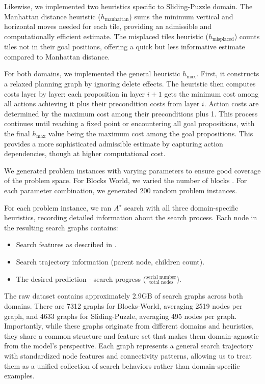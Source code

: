 \documentclass[letterpaper]{article}
\newcommand{\gur}[1]{{\color{teal}{Gur: #1}}}
\begin{document}
Likewise, we implemented two heuristics specific to Sliding-Puzzle domain. The Manhattan distance heuristic ($h_{\text{manhattan}}$) sums the minimum vertical and horizontal moves needed for each tile, providing an admissible and computationally efficient estimate. The misplaced tiles heuristic ($h_{\text{misplaced}}$) counts tiles not in their goal positions, offering a quick but less informative estimate compared to Manhattan distance.

For both domains, we implemented the general heuristic $h_{\max}$. First, it constructs a relaxed planning graph by ignoring delete effects. The heuristic then computes costs layer by layer: each proposition in layer $i+1$ gets the minimum cost among all actions achieving it plus their precondition costs from layer $i$. Action costs are determined by the maximum cost among their preconditions plus 1. This process continues until reaching a fixed point or encountering all goal propositions, with the final $h_{\max}$ value being the maximum cost among the goal propositions. This provides a more sophisticated admissible estimate by capturing action dependencies, though at higher computational cost.

We generated problem instances with varying parameters to ensure good coverage of the problem space. For Blocks World, we varied the number of blocks \gur{(5-10), number of stacks (3-5), and solution depth (7-15 moves). For Sliding Puzzles, we generated boards of different sizes (5x5 to 9x9) with varying solution depths (7-15 moves)}. For each parameter combination, we generated 200 random problem instances.

For each problem instance, we ran $A^{\star}$ search with all three domain-specific heuristics, recording detailed information about the search process. Each node in the resulting search graphs contains:
\begin{itemize}
    \item Search features as described in .
    \item Search trajectory information (parent node, children count).
    \item The desired prediction - search progress ($\frac{\text{serial number}}{\text{total nodes}}$).
\end{itemize}

The raw dataset contains approximately 2.9GB of search graphs across both domains. There are 7312 graphs for Blocks-World, averaging 2519 nodes per graph, and 4633 graphs for Sliding-Puzzle, averaging 495 nodes per graph. Importantly, while these graphs originate from different domains and heuristics, they share a common structure and feature set that makes them domain-agnostic from the model's perspective. Each graph represents a general search trajectory with standardized node features and connectivity patterns, allowing us to treat them as a unified collection of search behaviors rather than domain-specific examples.
\end{document}
